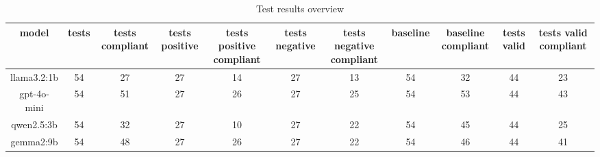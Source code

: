 
  \begin{table}[h!]
  \centering
  \begin{tabular}{|c|c|c|c|c|c|c|c|c|c|c|}
  \hline
  model & tests & tests compliant & tests positive & tests positive compliant & tests negative & tests negative compliant & baseline & baseline compliant & tests valid & tests valid compliant \\
  \hline
  llama3.2:1b & 54 & 27 & 27 & 14 & 27 & 13 & 54 & 32 & 44 & 23\\
\hline
gpt-4o-mini & 54 & 51 & 27 & 26 & 27 & 25 & 54 & 53 & 44 & 43\\
\hline
qwen2.5:3b & 54 & 32 & 27 & 10 & 27 & 22 & 54 & 45 & 44 & 25\\
\hline
gemma2:9b & 54 & 48 & 27 & 26 & 27 & 22 & 54 & 46 & 44 & 41
  \end{tabular}
  \caption{Test results overview}
  
  \end{table}
  